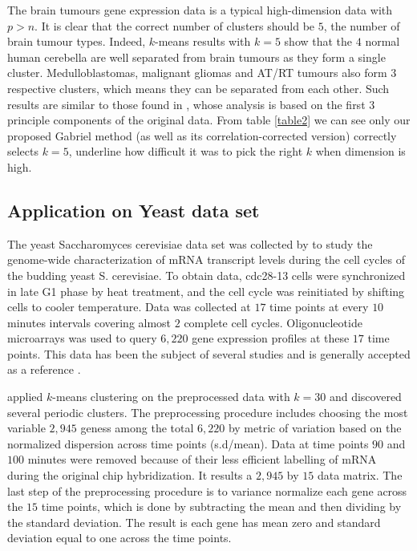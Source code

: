 \documentclass[12pt]{article}
\begin{document}
The brain tumours gene expression data is a typical high-dimension data with $p > n$. It is clear that 
the correct number of clusters should be $5$, the number of brain tumour types. Indeed, $k$-means results with $k=5$ show that the $4$ normal human cerebella are well separated from brain tumours as they form a single cluster.  
Medulloblastomas, malignant gliomas and AT/RT tumours also form $3$ respective clusters, which means they can be separated from each other. Such results are similar to those found in \cite{pomeroy2002prediction}, whose analysis
is based on the first $3$ principle components of the original data.    
From table \ref{table2} we can see only our proposed Gabriel method (as well as its correlation-corrected version) correctly selects $k=5$, underline how difficult it was to pick the right $k$ when dimension is high. 


\subsection{Application on Yeast data set}
The yeast Saccharomyces cerevisiae data set was collected by \cite{cho1998genome} to study the genome-wide characterization of mRNA transcript levels during the cell cycles of the budding yeast S. cerevisiae. To obtain data, 
cdc28-13 cells were synchronized in late G1 phase by heat treatment, and the cell cycle was reinitiated by shifting cells to cooler temperature. Data was collected at $17$ time points at every $10$ minutes intervals covering almost $2$ complete cell cycles. Oligonucleotide microarrays was used to query $6,220$ gene expression profiles at these $17$ time points. This data has been the subject of several studies and is generally accepted as a reference \citep{dortet2008model}.    

\cite{tavazoie1999systematic} applied $k$-means clustering on the preprocessed data with $k=30$ and discovered several periodic clusters. The preprocessing procedure includes choosing the most variable $2,945$ geness among the total $6,220$ by metric of variation based on the normalized dispersion across time points (s.d/mean). Data at time points $90$ and $100$ minutes were removed because of their less efficient labelling of mRNA during the original chip hybridization. It results a $2,945$ by $15$ data matrix. The last step of the preprocessing procedure is to variance normalize each gene across the $15$ time points, which is done by subtracting the mean and then dividing by the standard deviation. The result is each gene has mean zero and standard deviation equal to one across the time points.
\end{document}
